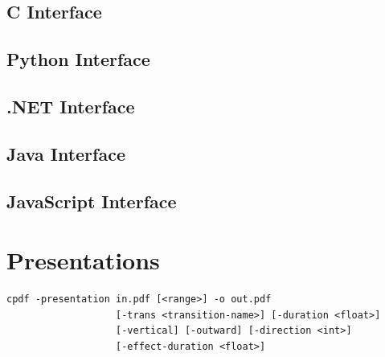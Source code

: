 \documentclass{book}
\begin{document}
\clearpage\pagestyle{empty}

\begin{cpdflib}
\clearpage
\section*{C Interface}
\begin{small}\tt

\end{small}
\end{cpdflib}

\begin{pycpdflib}
\clearpage
\section*{Python Interface}
\begin{small}\tt

\end{small}
\end{pycpdflib}

\begin{dotnetcpdflib}
\clearpage
\section*{.NET Interface}
\begin{small}\tt

\end{small}
\end{dotnetcpdflib}

\begin{jcpdflib}
\clearpage
\section*{Java Interface}
\begin{small}\tt

\end{small}
\end{jcpdflib}

\begin{jscpdflib}
\clearpage
\section*{JavaScript Interface}
\begin{small}\tt

\end{small}
\end{jscpdflib}

\chapter{Presentations}\label{chap:7}\pagestyle{fancy}
  \begin{framed}
  \small\noindent\begin{verbatim}
cpdf -presentation in.pdf [<range>] -o out.pdf
                   [-trans <transition-name>] [-duration <float>]
                   [-vertical] [-outward] [-direction <int>]
                   [-effect-duration <float>]\end{verbatim}
\end{framed}
\end{document}
